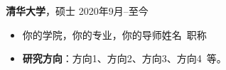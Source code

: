 \documentclass[11pt]{article}
\begin{document}
\begin{minipage}[t]{0.78\textwidth}
\begin{minipage}[t]{\textwidth}
        \vspace{0.5em}
        {\large \textbf{清华大学}}，硕士 \hfill 2020年9月--至今
        \begin{itemize}
            \item 你的学院，你的专业，你的导师姓名\ 职称
            \item \textbf{研究方向}：方向1、方向2、方向3、方向4\ 等。
        \end{itemize}
        
        \vspace{1.2em}
        \end{minipage}
    \end{minipage}
    \hfill
    \begin{minipage}[t]{0.2\textwidth}
        \vspace{2em} %
        \setlength{\fboxsep}{0pt}
    \end{minipage}
\end{document}
